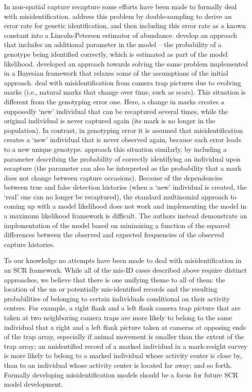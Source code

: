 \begin{table}[ht]
In non-spatial capture recapture some efforts have been made to
formally deal with misidentification. \citet{stevick_etal:2001}
address this problem by double-sampling to derive an error rate for
genetic identification, and then including this error rate as a known
constant into a Lincoln-Petersen estimator of
abundance. \citet{lukacs_burnham:2005} develop an approach that
includes an additional parameter in the model -- the probability of a
genotype being identified correctly, which is estimated as part of the
model likelihood. \citet{link_etal:2010} developed an approach towards
solving the same problem implemented in a Bayesian framework that
relaxes some of the assumptions of the initial approach.
\citet{yoshizaki_etal:2009} deal with misidentification from camera
trap pictures due to evolving marks (i.e., natural marks that change
over time, such as scars). This situation is different from the
genotyping error one. Here, a change in marks creates a supposedly
`new' individual that can be recaptured several times, while the
original individual is never captured again (its mark is no longer in
the population). In contrast, in genotyping error it is assumed that
misidentification creates a `new' individual that is never observed
again, because each error leads to a new unique
genotype. \citet{yoshizaki_etal:2009} approach this situation
similarly, by including a parameter describing the probability of
correctly identifying an individual upon recapture (the parameter can
also be interpreted as the probability that a mark does not change
between capture occasions). Because of the dependencies between true
and false detection histories (when a `new' individual is created, the
`real' one can no longer be recaptured), the standard multinomial
approach to coming up with a model likelihood does not work and
implementing the model in a maximum likelihood framework is
difficult. The authors instead demonstrate an implementation of the
model based on minimizing a function of the squared differences
between the observed and expected frequencies of the observed capture
histories.

To our knowledge no attempts have been made to deal with
misidentification in an SCR framework. While all of the mis-ID cases
described above require distinct approaches, we believe that there is
one unifying theme to all of them: the location of the un or
potentially mis-identified records and the resulting probabilities of
belonging to certain individuals conditional on their activity
centers. For example, a right flank and a left flank camera trap
picture that are taken at two neighboring camera traps are more likely
to belong to the same individual that a right and a left flank picture
taken at cameras at opposing ends of the trap array, especially if
animal movement is smaller than the extent of the trap array; an
unidentified record of a marked individual in a mark-resight survey is
more likely to belong to a marked individual whose activity center is
close by, than to an individual whose activity center is located far
away; and so forth. Formally developing misidentification models
should be a focus for future SCR model development.


\end{table}
